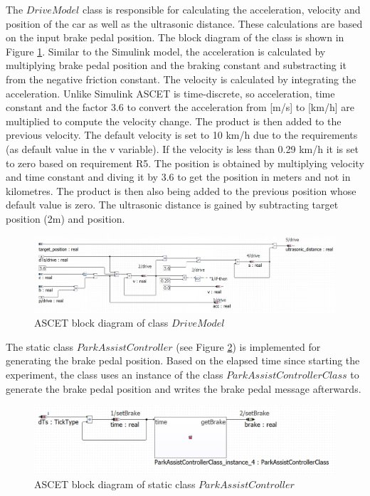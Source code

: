 The $DriveModel$ class is responsible for calculating the acceleration, velocity and position of the car as well as the ultrasonic distance.
These calculations are based on the input brake pedal position.
The block diagram of the class is shown in Figure \ref{fig:BlockdiagrammDrivingModel}.
Similar to the Simulink model, the acceleration is calculated by multiplying brake pedal position and the braking constant and substracting it from the negative friction constant. The velocity is calculated by integrating the acceleration.
Unlike Simulink ASCET is time-discrete, so acceleration, time constant and the factor 3.6 to convert the acceleration from [m/s] to [km/h] are multiplied to compute the velocity change. The product is then added to the previous velocity. The default velocity is set to 10 km/h due to the requirements (as default value in the v variable). If the velocity is less than 0.29 km/h it is set to zero based on requirement R5. The position is obtained by multiplying velocity and time constant and diving it by 3.6 to get the position in meters and not in kilometres. The product is then also being added to the previous position whose default value is zero. The ultrasonic distance is gained by subtracting target position (2m) and position.

\begin{figure}[H]
\centering
\includegraphics[width=1\textwidth]{images/Blockdiagramm_drivingmodel.png}
\caption{ASCET block diagram of class $DriveModel$}
\label{fig:BlockdiagrammDrivingModel}
\end{figure}

The static class $ParkAssistController$ (see Figure \ref{fig:BlockdiagrammParkAssistController}) is implemented for generating the brake pedal position. Based on the elapsed time since starting the experiment, the class uses an instance of the class $ParkAssistControllerClass$ to generate the brake pedal position and writes the brake pedal message afterwards. 

\begin{figure}[H]
\centering
\includegraphics[width=1\textwidth]{images/Blockdiagramm_ParkAssistController.png}
\caption{ASCET block diagram of static class $ParkAssistController$}
\label{fig:BlockdiagrammParkAssistController}
\end{figure}

